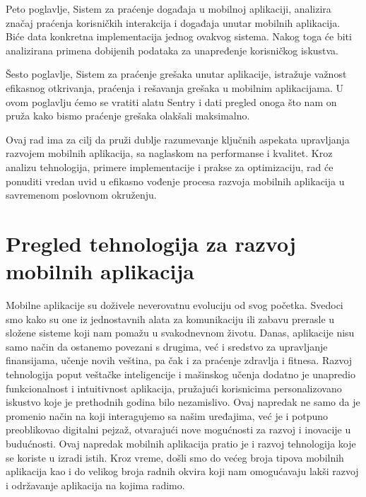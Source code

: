 \documentclass[12pt,oneside]{memoir}
\begin{document}
Peto poglavlje, Sistem za praćenje događaja u mobilnoj aplikaciji, analizira značaj praćenja korisničkih interakcija i događaja unutar mobilnih aplikacija. Biće data konkretna implementacija jednog ovakvog sistema. Nakog toga će biti analizirana primena dobijenih podataka za unapređenje korisničkog iskustva.

Šesto poglavlje, Sistem za praćenje grešaka unutar aplikacije, istražuje važnost efikasnog otkrivanja, praćenja i rešavanja grešaka u mobilnim aplikacijama. U ovom poglavlju ćemo se vratiti alatu Sentry i dati pregled onoga što nam on pruža kako bismo praćenje grešaka olakšali maksimalno.

Ovaj rad ima za cilj da pruži dublje razumevanje ključnih aspekata upravljanja razvojem mobilnih aplikacija, sa naglaskom na performanse i kvalitet. Kroz analizu tehnologija, primere implementacije i prakse za optimizaciju, rad će ponuditi vredan uvid u efikasno vođenje procesa razvoja mobilnih aplikacija u savremenom poslovnom okruženju.

\chapter{Pregled tehnologija za razvoj mobilnih aplikacija}
\label{chp:pregledTehnologijaZaRazvojMobilnihAplikacija}

Mobilne aplikacije su doživele neverovatnu evoluciju od svog početka. Svedoci smo kako su one iz jednostavnih alata za komunikaciju ili zabavu prerasle u složene sisteme koji nam pomažu u svakodnevnom životu. Danas, aplikacije nisu samo način da ostanemo povezani s drugima, već i sredstvo za upravljanje finansijama, učenje novih veština, pa čak i za praćenje zdravlja i fitnesa. Razvoj tehnologija poput veštačke inteligencije i mašinskog učenja dodatno je unapredio funkcionalnost i intuitivnost aplikacija, pružajući korisnicima personalizovano iskustvo koje je prethodnih godina bilo nezamislivo. Ovaj napredak ne samo da je promenio način na koji interagujemo sa našim uređajima, već je i potpuno preoblikovao digitalni pejzaž, otvarajući nove mogućnosti za razvoj i inovacije u budućnosti. Ovaj napredak mobilnih aplikacija pratio je i razvoj tehnologija koje se koriste u izradi istih. Kroz vreme, došli smo do većeg broja tipova mobilnih aplikacija kao i do velikog broja radnih okvira koji nam omogućavaju lakši razvoj i održavanje aplikacija na kojima radimo.
\end{document}
